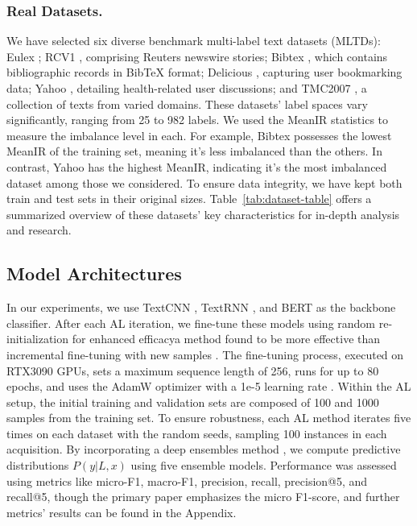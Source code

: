 \documentclass[letterpaper]{article} %
\begin{document}
\subsubsection{Real Datasets.}



We have selected six diverse benchmark multi-label text datasets (MLTDs): Eulex \cite{LozaMenca2010}; RCV1 \cite{10.5555/1005332.1005345}, comprising Reuters newswire stories; Bibtex \cite{Katakis2008MultilabelTC}, which contains bibliographic records in BibTeX format; Delicious \cite{Tsoumakas2008EffectiveAE}, capturing user bookmarking data; Yahoo \cite{10.5555/2968618.2968710}, detailing health-related user discussions; and TMC2007 \cite{1559692}, a collection of texts from varied domains.
These datasets' label spaces vary significantly, ranging from 25 to 982 labels. We used the MeanIR statistics to measure the imbalance level in each.
For example, Bibtex possesses the lowest MeanIR of the training set, meaning it's less imbalanced than the others. In contrast, Yahoo has the highest MeanIR, indicating it's the most imbalanced dataset among those we considered.
To ensure data integrity, we have kept both train and test sets in their original sizes. Table~\ref{tab:dataset-table} offers a summarized overview of these datasets' key characteristics for in-depth analysis and research.






\subsection{Model Architectures}

In our experiments, we use TextCNN \cite{kim-2014-convolutional}, TextRNN \cite{8632592}, and BERT \cite{devlin-etal-2019-bert} as the backbone classifier.
After each AL iteration, we fine-tune these models using random re-initialization \cite{frankle2018lottery} for enhanced efficacya method found to be more effective than incremental fine-tuning with new samples \cite{gal2017deep}. The fine-tuning process, executed on RTX3090 GPUs, sets a maximum sequence length of 256, runs for up to 80 epochs, and uses the AdamW optimizer with a 1e-5 learning rate \cite{nguyen-etal-2022-hardness,Nguyen_Tan_Du_Buntine_Beare_Chen_2023,nguyen2023lowresource}. Within the AL setup, the initial training and validation sets are composed of 100 and 1000 samples from the training set. To ensure robustness, each AL method iterates five times on each dataset with the random seeds, sampling 100 instances in each acquisition. By incorporating a deep ensembles method \cite{10.5555/3295222.3295387}, we compute predictive distributions $P(y| L, x)$ using five ensemble models. Performance was assessed using metrics like micro-F1, macro-F1, precision, recall, precision@5, and recall@5, though the primary paper emphasizes the micro F1-score, and further metrics' results can be found in the Appendix.
\end{document}
